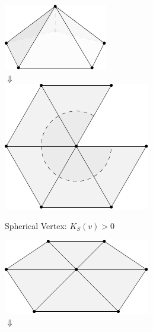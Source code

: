 \documentclass{stdlocal}
\begin{document}
  \begin{figure}
    \centering
    \begin{subfigure}[b]{0.32\linewidth}
      \centering
      \includegraphics[width=0.65\linewidth]{figures/spherical-vertex.pdf}\\[0.5em]
      $\Downarrow$\\[1em]
      \includegraphics[width=0.65\linewidth]{figures/spherical-vertex-unfolded.pdf}
      \caption{Spherical Vertex: $K_S(v) > 0$}
    \end{subfigure}
    \begin{subfigure}[b]{0.32\linewidth}
      \centering
      \includegraphics[width=0.65\linewidth]{figures/euclidean-vertex.pdf}\\[0.5em]
      $\Downarrow$\\[1em]

\end{subfigure}
\end{figure}
\end{document}
